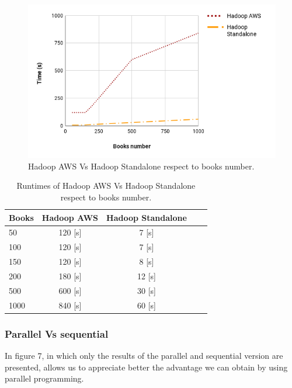 \documentclass[10pt,twocolumn,letterpaper]{article}
\begin{document}
\begin{figure}[H]
\begin{center}
\includegraphics[width=\columnwidth]{template/latex/awsVsst.png}
\caption{Hadoop AWS Vs Hadoop Standalone respect to books number.}
\label{fig:short}
\end{center}
\end{figure}
\begin{table}[H]
\begin{center}
\begin{tabular}{|l|c|c|c|c|}
\hline
Books & Hadoop AWS & Hadoop Standalone\\
\hline\hline
50 & 120 [s] & 7 [s]\\
100 & 120 [s] & 7 [s]\\
150 & 120 [s] & 8 [s]\\
200 & 180 [s] & 12 [s]\\
500 & 600 [s] & 30 [s]\\
1000 & 840 [s] & 60 [s]\\
\hline
\end{tabular}
\end{center}
\caption{Runtimes of Hadoop AWS Vs Hadoop Standalone respect to books number.}
\end{table}
\newpage
\subsubsection{Parallel Vs sequential}

In figure 7, in which only the results of the parallel and sequential version are presented, allows us to appreciate better the advantage we can obtain by using parallel programming.
\end{document}
